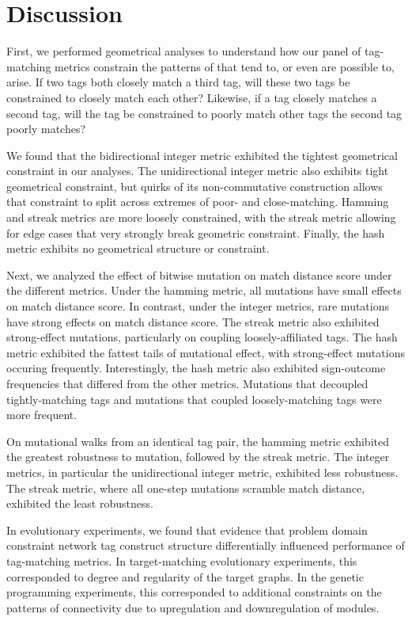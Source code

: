 \section{Discussion}


% 
First, we performed geometrical analyses to understand how our panel of tag-matching metrics constrain the patterns of that tend to, or even are possible to, arise.
If two tags both closely match a third tag, will these two tags be constrained to closely match each other?
Likewise, if a tag closely matches a second tag, will the tag be constrained to poorly match other tags the second tag poorly matches?

We found that the bidirectional integer metric exhibited the tightest geometrical constraint in our analyses.
The unidirectional integer metric also exhibits tight geometrical constraint, but quirks of its non-commutative construction allows that constraint to split across extremes of poor- and close-matching.
Hamming and streak metrics are more loosely constrained, with the streak metric allowing for edge cases that very strongly break geometric constraint.
Finally, the hash metric exhibits no geometrical structure or constraint.

Next, we analyzed the effect of bitwise mutation on match distance score under the different metrics.
Under the hamming metric, all mutations have small effects on match distance score.
In contrast, under the integer metrics, rare mutations have strong effects on match distance score.
The streak metric also exhibited strong-effect mutations, particularly on coupling loosely-affiliated tags.
The hash metric exhibited the fattest tails of mutational effect, with strong-effect mutations occuring frequently.
Interestingly, the hash metric also exhibited sign-outcome frequencies that differed from the other metrics.
Mutations that decoupled tightly-matching tags and mutations that coupled loosely-matching tags were more frequent.

On mutational walks from an identical tag pair, the hamming metric exhibited the greatest robustness to mutation, followed by the streak metric.
The integer metrics, in particular the unidirectional integer metric, exhibited less robustness.
The streak metric, where all one-step mutations scramble match distance, exhibited the least robustness.

In evolutionary experiments, we found that evidence that problem domain constraint network tag construct structure differentially influenced performance of tag-matching metrics. 
In target-matching evolutionary experiments, this corresponded to degree and regularity of the target graphs.
In the genetic programming experiments, this corresponded to additional constraints on the patterns of connectivity due to upregulation and downregulation of modules.

